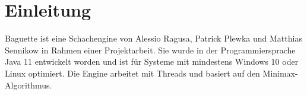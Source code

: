 \section{Einleitung}
Baguette ist eine Schachengine von Alessio Ragusa, Patrick Plewka und Matthias Sennikow in Rahmen einer Projektarbeit.
Sie wurde in der Programmiersprache Java 11 entwickelt worden und ist für Systeme mit mindestens Windows 10 oder Linux optimiert. \newline
Die Engine arbeitet mit Threads und basiert auf den Minimax-Algorithmus. 
\pagebreak
